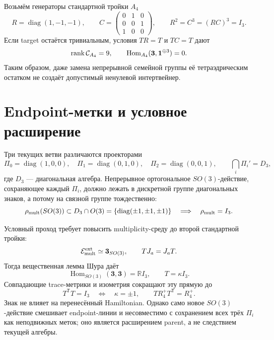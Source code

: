 Возьмём генераторы стандартной тройки $A_4$
\begin{equation}
 R=\operatorname{diag}(1,-1,-1),\qquad
 C=\begin{pmatrix}0&1&0\\0&0&1\\1&0&0\end{pmatrix},
 \qquad R^2=C^3=(RC)^3=I_3.
 \label{eq:v8-baryon-c0-family-a4-generators}
\end{equation}
Если target остаётся тривиальным, условия $TR=T$ и $TC=T$ дают
\begin{equation}
 \operatorname{rank}\mathcal C_{A_4}=9,\qquad
 \operatorname{Hom}_{A_4}(\mathbf3,\mathbf1^{\oplus3})=0.
 \label{eq:v8-baryon-c0-family-multiplicity-a4-hom-zero}
\end{equation}
Таким образом, даже замена непрерывной семейной группы её тетраэдрическим
остатком не создаёт допустимый ненулевой интертвейнер.

\section{Endpoint-метки и условное расширение}

Три текущих ветви различаются проекторами
\begin{equation}
 \Pi_0=\operatorname{diag}(1,0,0),\quad
 \Pi_1=\operatorname{diag}(0,1,0),\quad
 \Pi_2=\operatorname{diag}(0,0,1),\qquad
 \bigcap_i\Pi_i'=D_3,
 \label{eq:v8-baryon-c0-endpoint-projector-commutant}
\end{equation}
где $D_3$ --- диагональная алгебра. Непрерывное ортогональное
$SO(3)$-действие, сохраняющее каждый $\Pi_i$, должно лежать в дискретной
группе диагональных знаков, а потому на связной группе тождественно:
\begin{equation}
 \rho_{\rm mult}(SO(3))\subset D_3\cap O(3)
 =\{\operatorname{diag}(\pm1,\pm1,\pm1)\}
 \quad\Longrightarrow\quad \rho_{\rm mult}=I_3.
 \label{eq:v8-baryon-c0-endpoint-preserving-so3-triviality}
\end{equation}

Условный проход требует повысить multiplicity-среду до второй стандартной
тройки:
\begin{equation}
 \mathcal E_{\rm mult}^{\rm ext}\simeq\mathbf3_{SO(3)},
 \qquad
 T J_a=J_aT.
 \label{eq:v8-baryon-c0-promoted-multiplicity-so3-action}
\end{equation}
Тогда вещественная лемма Шура даёт
\begin{equation}
 \operatorname{Hom}_{SO(3)}(\mathbf3,\mathbf3)=\mathbb R I_3,
 \qquad T=\kappa I_3.
 \label{eq:v8-baryon-c0-promoted-intertwiner-schur-line}
\end{equation}
Совпадающие trace-метрики и изометрия сокращают эту прямую до
\begin{equation}
 T^{\mathsf T}T=I_3
 \quad\Longleftrightarrow\quad \kappa=\pm1,
 \qquad
 T R_4^+T^{\mathsf T}=R_4^+.
 \label{eq:v8-baryon-c0-promoted-isometric-intertwiner}
\end{equation}
Знак не влияет на перенесённый Hamiltonian. Однако само новое
$SO(3)$-действие смешивает endpoint-линии и несовместимо с сохранением
всех трёх $\Pi_i$ как неподвижных меток; оно является расширением parent,
а не следствием текущей алгебры.

